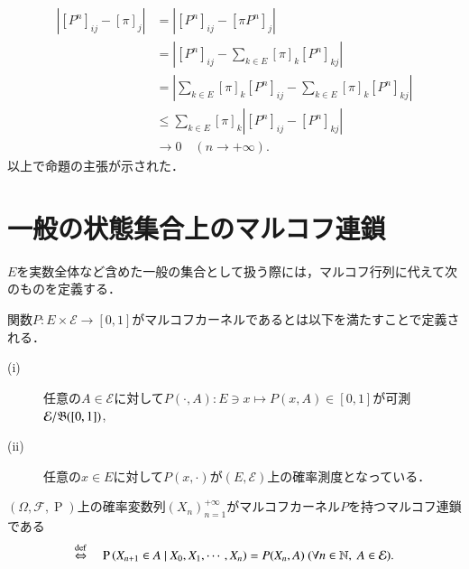 \begin{prf}
\begin{description}
		\begin{align}
			\left| [P^n]_{ij} - [\pi]_j \right| &= \left| [P^n]_{ij} - [\pi P^n]_j \right| \\
			&= \left| [P^n]_{ij} - \sum_{k \in E}[\pi]_k[P^n]_{kj} \right| \\
			&= \left| \sum_{k \in E}[\pi]_k[P^n]_{ij} - \sum_{k \in E}[\pi]_k[P^n]_{kj} \right| \\
			&\leq \sum_{k \in E}[\pi]_k\left| [P^n]_{ij} - [P^n]_{kj} \right| \\
			&\longrightarrow 0 \quad (n \longrightarrow +\infty).
		\end{align}
		以上で命題の主張が示された．
		\QED
	\end{description}
	\end{prf}
	
\section{一般の状態集合上のマルコフ連鎖}
	$E$を実数全体など含めた一般の集合として扱う際には，マルコフ行列に代えて次のものを定義する．
	\begin{dfn}[マルコフカーネル]
		関数$P:E \times \mathcal{E} \longrightarrow [0,1]$がマルコフカーネルであるとは以下を満たすことで定義される．
		\begin{description}
			\item[\rm{(i)}] 任意の$A \in \mathcal{E}$に対して$P(\cdot,A):E \ni x \longmapsto P(x,A) \in [0,1]$が可測$\mathcal{E}/\mathfrak{B}([0,1])$,
			\item[\rm{(ii)}] 任意の$x \in E$に対して$P(x,\cdot)$が$(E,\mathcal{E})$上の確率測度となっている．
		\end{description}
	\end{dfn}
	\begin{dfn}[マルコフ連鎖]
		$(\Omega,\mathcal{F},\operatorname{P})$上の確率変数列$(X_n)_{n=1}^{+\infty}$がマルコフカーネル$P$を持つマルコフ連鎖である
		\begin{align}
			\overset{\mathrm{def}}{\Leftrightarrow}\quad \operatorname{P} \left( X_{n+1} \in A \ \middle|\ X_0,X_1,\cdots,X_n \right) = P(X_n,A)\ (\forall n \in \mathbb{N},\ A \in \mathcal{E}).
		\end{align}
	\end{dfn}
	
